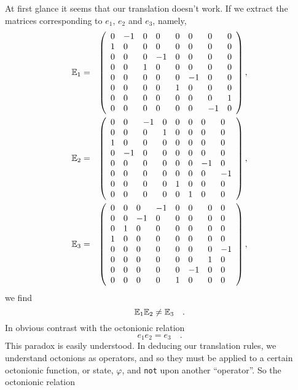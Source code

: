 \documentclass[a4paper,12pt]{book}
\begin{document}
At first glance it seems that our translation doesn't work. If we extract
the matrices corresponding to $e_{1}$, $e_{2}$ and $e_{3}$, namely, 
\begin{eqnarray*}
\Bbb{E}_{1} &=&\left( 
\begin{array}{llllllll}
0 & -1 & 0 & 0 & 0 & 0 & 0 & 0 \\ 
1 & 0 & 0 & 0 & 0 & 0 & 0 & 0 \\ 
0 & 0 & 0 & -1 & 0 & 0 & 0 & 0 \\ 
0 & 0 & 1 & 0 & 0 & 0 & 0 & 0 \\ 
0 & 0 & 0 & 0 & 0 & -1 & 0 & 0 \\ 
0 & 0 & 0 & 0 & 1 & 0 & 0 & 0 \\ 
0 & 0 & 0 & 0 & 0 & 0 & 0 & 1 \\ 
0 & 0 & 0 & 0 & 0 & 0 & -1 & 0
\end{array}
\right) , \\
\Bbb{E}_{2} &=&\left( 
\begin{array}{llllllll}
0 & 0 & -1 & 0 & 0 & 0 & 0 & 0 \\ 
0 & 0 & 0 & 1 & 0 & 0 & 0 & 0 \\ 
1 & 0 & 0 & 0 & 0 & 0 & 0 & 0 \\ 
0 & -1 & 0 & 0 & 0 & 0 & 0 & 0 \\ 
0 & 0 & 0 & 0 & 0 & 0 & -1 & 0 \\ 
0 & 0 & 0 & 0 & 0 & 0 & 0 & -1 \\ 
0 & 0 & 0 & 0 & 1 & 0 & 0 & 0 \\ 
0 & 0 & 0 & 0 & 0 & 1 & 0 & 0
\end{array}
\right) , \\
\Bbb{E}_{3} &=&\left( 
\begin{array}{llllllll}
0 & 0 & 0 & -1 & 0 & 0 & 0 & 0 \\ 
0 & 0 & -1 & 0 & 0 & 0 & 0 & 0 \\ 
0 & 1 & 0 & 0 & 0 & 0 & 0 & 0 \\ 
1 & 0 & 0 & 0 & 0 & 0 & 0 & 0 \\ 
0 & 0 & 0 & 0 & 0 & 0 & 0 & -1 \\ 
0 & 0 & 0 & 0 & 0 & 0 & 1 & 0 \\ 
0 & 0 & 0 & 0 & 0 & -1 & 0 & 0 \\ 
0 & 0 & 0 & 0 & 1 & 0 & 0 & 0
\end{array}
\right) ,
\end{eqnarray*}
we find 
\begin{equation}
\Bbb{E}_{1}\Bbb{E}_{2}\neq \Bbb{E}_{3}\quad .
\end{equation}
In obvious contrast with the octonionic relation 
\begin{equation}
e_{1}e_{2}=e_{3}\quad .
\end{equation}
This paradox is easily understood. In deducing our translation rules, we
understand octonions as operators, and so they must be applied to a certain
octonionic function, or state, $\varphi $, and \texttt{not} upon another
``operator''. So the octonionic relation
\end{document}
